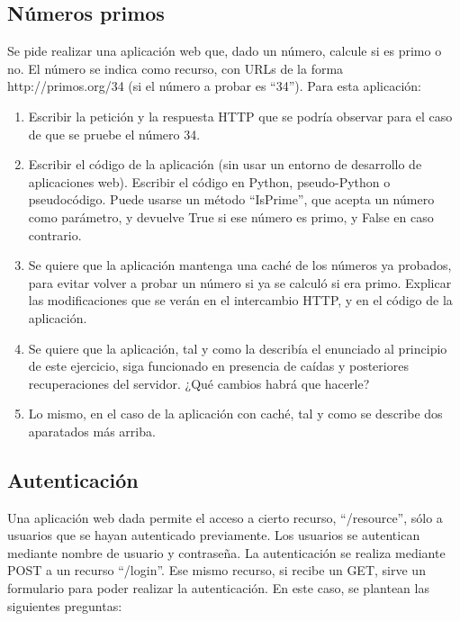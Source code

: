 \subsection{Números primos}

Se pide realizar una aplicación web que, dado un número, calcule si es primo o no. El número se indica como recurso, con URLs de la forma http://primos.org/34 (si el número a probar es ``34''). Para esta aplicación:

\begin{enumerate}
\item Escribir la petición y la respuesta HTTP que se podría observar para el caso de que se pruebe el número 34.
\item Escribir el código de la aplicación (sin usar un entorno de desarrollo de aplicaciones web). Escribir el código en Python, pseudo-Python o pseudocódigo. Puede usarse un método ``IsPrime'', que acepta un número como parámetro, y devuelve True si ese número es primo, y False en caso contrario.
\item Se quiere que la aplicación mantenga una caché de los números ya probados, para evitar volver a probar un número si ya se calculó si era primo. Explicar las modificaciones que se verán en el intercambio HTTP, y en el código de la aplicación.
\item Se quiere que la aplicación, tal y como la describía el enunciado al principio de este ejercicio, siga funcionado en presencia de caídas y posteriores recuperaciones del servidor. ¿Qué cambios habrá que hacerle?
\item Lo mismo, en el caso de la aplicación con caché, tal y como se describe dos aparatados más arriba.
\end{enumerate}

\subsection{Autenticación}

Una aplicación web dada permite el acceso a cierto recurso, ``/resource'', sólo a usuarios que se hayan autenticado previamente. Los usuarios se autentican mediante nombre de usuario y contraseña. La autenticación se realiza mediante POST a un recurso ``/login''. Ese mismo recurso, si recibe un GET, sirve un formulario para poder realizar la autenticación. En este caso, se plantean las siguientes preguntas:

